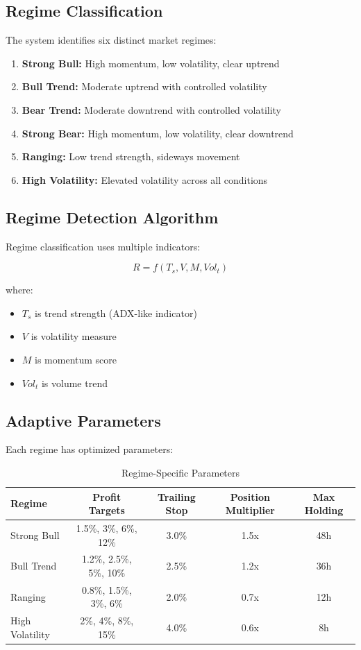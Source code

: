 \documentclass[11pt,a4paper]{article}
\begin{document}
\subsection{Regime Classification}

The system identifies six distinct market regimes:

\begin{enumerate}
    \item \textbf{Strong Bull:} High momentum, low volatility, clear uptrend
    \item \textbf{Bull Trend:} Moderate uptrend with controlled volatility
    \item \textbf{Bear Trend:} Moderate downtrend with controlled volatility
    \item \textbf{Strong Bear:} High momentum, low volatility, clear downtrend
    \item \textbf{Ranging:} Low trend strength, sideways movement
    \item \textbf{High Volatility:} Elevated volatility across all conditions
\end{enumerate}

\subsection{Regime Detection Algorithm}

Regime classification uses multiple indicators:

\begin{equation}
R = f(T_s, V, M, Vol_t)
\label{eq:regime_detection}
\end{equation}

where:
\begin{itemize}
    \item $T_s$ is trend strength (ADX-like indicator)
    \item $V$ is volatility measure
    \item $M$ is momentum score
    \item $Vol_t$ is volume trend
\end{itemize}

\subsection{Adaptive Parameters}

Each regime has optimized parameters:

\begin{table}[H]
\centering
\caption{Regime-Specific Parameters}
\label{tab:regime_params}
\begin{tabular}{@{}lcccc@{}}
\toprule
Regime & Profit Targets & Trailing Stop & Position Multiplier & Max Holding \\
\midrule
Strong Bull & 1.5\%, 3\%, 6\%, 12\% & 3.0\% & 1.5x & 48h \\
Bull Trend & 1.2\%, 2.5\%, 5\%, 10\% & 2.5\% & 1.2x & 36h \\
Ranging & 0.8\%, 1.5\%, 3\%, 6\% & 2.0\% & 0.7x & 12h \\
High Volatility & 2\%, 4\%, 8\%, 15\% & 4.0\% & 0.6x & 8h \\
\bottomrule
\end{tabular}
\end{table}
\end{document}
